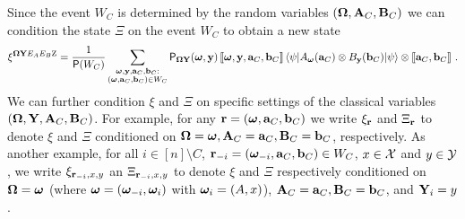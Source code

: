 Since the event $W_C$ is determined by the random variables $(\bOmega,\bA_C,\bB_C)$ we can {condition} the state $\Xi$ on the event $W_C$ to obtain a new state
\[
	\xi^{\bOmega \bY E_A E_B \ac} = \frac{1}{\P(W_C)} \sum_{\substack{\bomega, \by, \ba_C, \bb_C: \\ (\bomega,\ba_C,\bb_C) \in W_C}} \P_{\bOmega \bY}(\bomega, \by) \, \puretomixed{\bomega, \by, \ba_C, \bb_C} \, \bra{\psi} A_\bomega(\ba_C) \otimes B_\by(\bb_C) \ket{\psi} \otimes \puretomixed{\ba_C,\bb_C}~.
\]
We can further condition $\xi$ and $\Xi$ on specific settings of the classical variables $(\bOmega,\bY,\bA_C,\bB_C)$. For example, for any $\br = (\bomega,\ba_C,\bb_C)$ we write $\xi_\br$ and $\Xi_\br$ to denote $\xi$ and $\Xi$ conditioned on $\bOmega = \bomega, \bA_C = \ba_C,\bB_C = \bb_C$, respectively. As another example, for all $i \in [n] \setminus C$, $\br_\mi = (\bomega_\mi,\ba_C,\bb_C) \in W_C$, $x \in \X$ and $y \in \Y$, we write $\xi_{\br_\mi,x,y}$ an $\Xi_{\br_\mi,x,y}$ to denote $\xi$ and $\Xi$ respectively conditioned on $\bOmega = \bomega$ (where $\bomega = (\bomega_\mi,\bomega_i)$ with $\bomega_i = (A,x)$),  $\bA_C = \ba_C, \bB_C = \bb_C$, and $\bY_i = y$.
%

